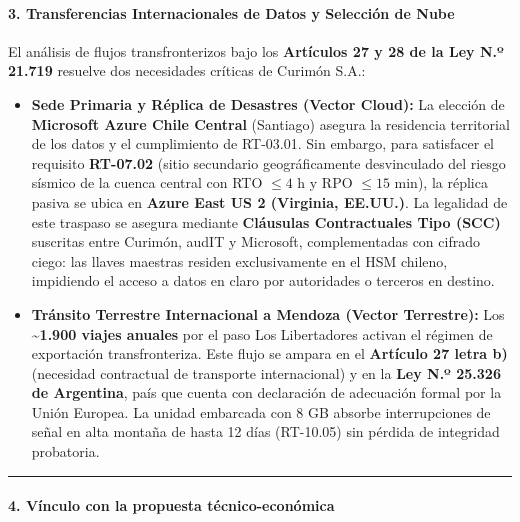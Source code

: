 \paragraph{3. Transferencias Internacionales de Datos y Selección de Nube}\label{transferencias-internacionales-de-datos-y-selecciuxf3n-de-nube}

El análisis de flujos transfronterizos bajo los \textbf{Artículos 27 y 28 de la Ley N.º 21.719} resuelve dos necesidades críticas de Curimón S.A.:

\begin{itemize}
\tightlist
\item
  \textbf{Sede Primaria y Réplica de Desastres (Vector Cloud):} La elección de \textbf{Microsoft Azure Chile Central} (Santiago) asegura la residencia territorial de los datos y el cumplimiento de RT-03.01. Sin embargo, para satisfacer el requisito \textbf{RT-07.02} (sitio secundario geográficamente desvinculado del riesgo sísmico de la cuenca central con RTO \(\le 4\text{ h}\) y RPO \(\le 15\text{ min}\)), la réplica pasiva se ubica en \textbf{Azure East US 2 (Virginia, EE.UU.)}. La legalidad de este traspaso se asegura mediante \textbf{Cláusulas Contractuales Tipo (SCC)} suscritas entre Curimón, audIT y Microsoft, complementadas con cifrado ciego: las llaves maestras residen exclusivamente en el HSM chileno, impidiendo el acceso a datos en claro por autoridades o terceros en destino.
\item
  \textbf{Tránsito Terrestre Internacional a Mendoza (Vector Terrestre):} Los \textbf{\textasciitilde1.900 viajes anuales} por el paso Los Libertadores activan el régimen de exportación transfronteriza. Este flujo se ampara en el \textbf{Artículo 27 letra b)} (necesidad contractual de transporte internacional) y en la \textbf{Ley N.º 25.326 de Argentina}, país que cuenta con declaración de adecuación formal por la Unión Europea. La unidad embarcada con 8 GB absorbe interrupciones de señal en alta montaña de hasta 12 días (RT-10.05) sin pérdida de integridad probatoria.
\end{itemize}

\begin{center}\rule{0.5\linewidth}{0.5pt}\end{center}

\paragraph{4. Vínculo con la propuesta técnico-económica}\label{vuxednculo-con-la-propuesta-tuxe9cnico-econuxf3mica}

